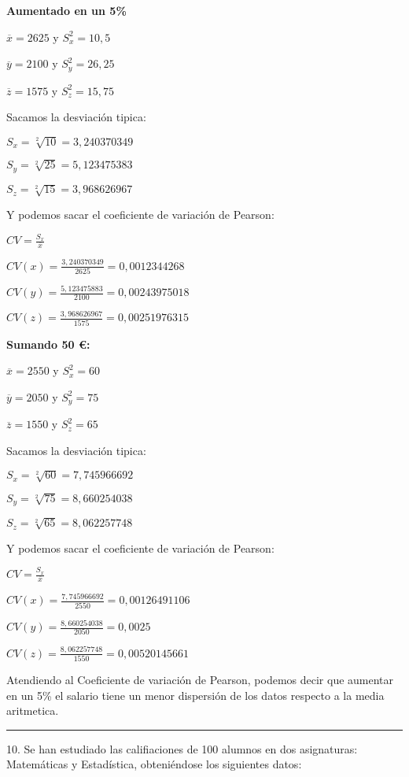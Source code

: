 \documentclass{article}
\begin{document}
\textbf{Aumentado en un 5\%}

\(\overline{x} = 2625\) y \( S_{x}^2 = 10,5\)

\(\overline{y} = 2100\) y \(S_{y}^2 = 26,25\)

\(\overline{z} = 1575\) y \(S_{z}^2 = 15,75\)


Sacamos la desviaci\'on tipica:

\(S_{x} = \sqrt[2]{10} = 3,240370349\)

\(S_{y} = \sqrt[2]{25} = 5,123475383\)

\(S_{z} = \sqrt[2]{15} = 3,968626967\)

Y podemos sacar el coeficiente de variaci\'on de Pearson:

\(CV = \frac{S_{x}}{\overline{x}}\)

\(CV(x) = \frac{3,240370349}{2625} = 0,0012344268\) 

\(CV(y) = \frac{5,123475883}{2100} = 0,00243975018\) 

\(CV(z) = \frac{3,968626967}{1575} = 0,00251976315\)  

\textbf{Sumando 50 \euro:}

\(\overline{x} = 2550\) y \( S_{x}^2 = 60\)

\(\overline{y} = 2050\) y \(S_{y}^2 = 75\)

\(\overline{z} = 1550\) y \(S_{z}^2 = 65\)


Sacamos la desviaci\'on tipica:

\(S_{x} = \sqrt[2]{60} = 7,745966692\)

\(S_{y} = \sqrt[2]{75} = 8,660254038\)

\(S_{z} = \sqrt[2]{65} = 8,062257748\)

Y podemos sacar el coeficiente de variaci\'on de Pearson:

\(CV = \frac{S_{x}}{\overline{x}}\)

\(CV(x) = \frac{7,745966692}{2550} = 0,00126491106\) 

\(CV(y) = \frac{8,660254038}{2050} = 0,0025\) 

\(CV(z) = \frac{8,062257748}{1550} = 0,00520145661\)  

Atendiendo al Coeficiente de variaci\'on de Pearson, podemos decir que aumentar en un 5\% el salario tiene un menor dispersi\'on de los datos respecto a la media aritmetica.

\rule{119mm}{0.5mm}

10. Se han estudiado las califiaciones de 100 alumnos en dos asignaturas: Matem\'aticas y Estad\'istica, obteni\'endose los siguientes datos:
\end{document}
